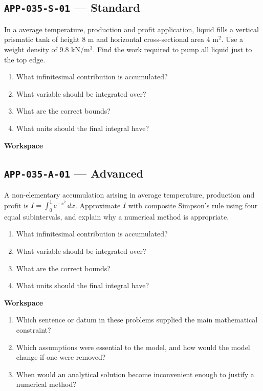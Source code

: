 \documentclass[11pt]{book}
\newcommand{\pid}[1]{\texttt{#1}}
\newcommand{\workspace}{\par\vspace{0.7in}\hrulefill\par\vspace{0.55in}\hrulefill\par}
\begin{document}
\subsection*{\pid{APP-035-S-01} — Standard}
\begin{problembox}
In a average temperature, production and profit application, liquid fills a vertical prismatic tank of height 8 m and horizontal cross-sectional area 4 m$^2$. Use a weight density of 9.8 kN/m$^3$. Find the work required to pump all liquid just to the top edge.
\end{problembox}
\begin{promptbox}\begin{enumerate}
\item What infinitesimal contribution is accumulated?
\item What variable should be integrated over?
\item What are the correct bounds?
\item What units should the final integral have?
\end{enumerate}\end{promptbox}
\textbf{Workspace}\workspace
{}
\subsection*{\pid{APP-035-A-01} — Advanced}
\begin{problembox}
A non-elementary accumulation arising in average temperature, production and profit is $I=\int_0^1 e^{-x^2}\,dx$. Approximate $I$ with composite Simpson's rule using four equal subintervals, and explain why a numerical method is appropriate.
\end{problembox}
\begin{promptbox}\begin{enumerate}
\item What infinitesimal contribution is accumulated?
\item What variable should be integrated over?
\item What are the correct bounds?
\item What units should the final integral have?
\end{enumerate}\end{promptbox}
\textbf{Workspace}\workspace
\begin{reflectionbox}\begin{enumerate}
\item Which sentence or datum in these problems supplied the main mathematical constraint?
\item Which assumptions were essential to the model, and how would the model change if one were removed?
\item When would an analytical solution become inconvenient enough to justify a numerical method?
\end{enumerate}\end{reflectionbox}
\end{document}
